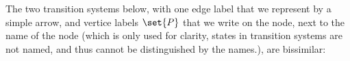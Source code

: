 \begin{example}
    The two transition systems below, with one edge label that we represent by a simple arrow,
    and vertice labels $\set{P}$ that we write on the node, next to the name of the node (which is only used for clarity, states in transition systems are not named, and thus cannot be distinguished by the names.), are bissimilar:

    \begin{center}
    \end{center}


\end{example}
